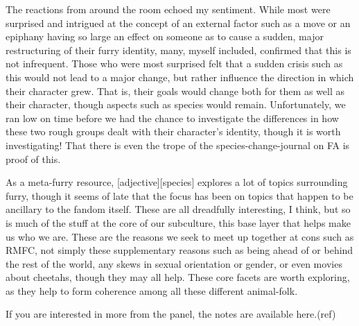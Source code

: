 The reactions from around the room echoed my sentiment. While most were surprised and intrigued at the concept of an external factor such as a move or an epiphany having so large an effect on someone as to cause a sudden, major restructuring of their furry identity, many, myself included, confirmed that this is not infrequent. Those who were most surprised felt that a sudden crisis such as this would not lead to a major change, but rather influence the direction in which their character grew. That is, their goals would change both for them as well as their character, though aspects such as species would remain. Unfortunately, we ran low on time before we had the chance to investigate the differences in how these two rough groups dealt with their character's identity, though it is worth investigating! That there is even the trope of the species-change-journal on FA is proof of this.

As a meta-furry resource, [adjective][species] explores a lot of topics surrounding furry, though it seems of late that the focus has been on topics that happen to be ancillary to the fandom itself. These are all dreadfully interesting, I think, but so is much of the stuff at the core of our subculture, this base layer that helps make us who we are. These are the reasons we seek to meet up together at cons such as RMFC, not simply these supplementary reasons such as being ahead of or behind the rest of the world, any skews in sexual orientation or gender, or even movies about cheetahs, though they may all help. These core facets are worth exploring, as they help to form coherence among all these different animal-folk.

If you are interested in more from the panel, the notes are available here.(ref)
